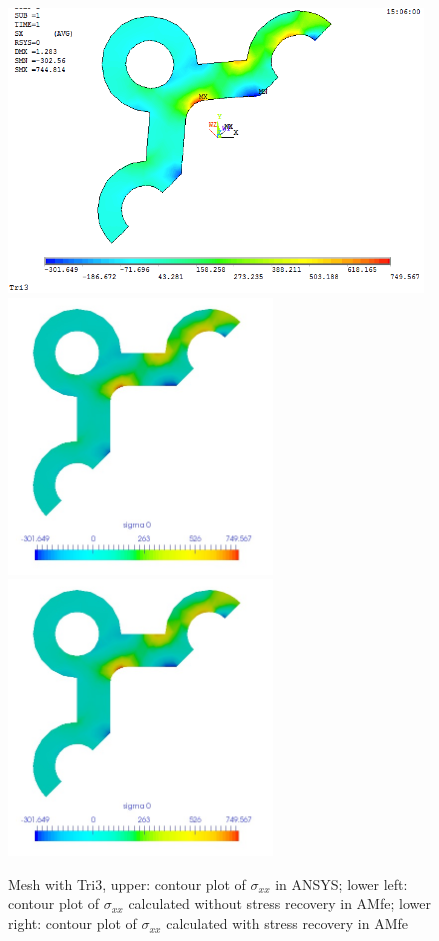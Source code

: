 \begin{figure}[htbp]
	\begin{center}
		\includegraphics[width=11cm,clip]{TTri3_Sxx.png} 	
		\includegraphics[width=7cm,clip]{TTri3_Sxx_PD.png} 		
		\includegraphics[width=7cm,clip]{TTri3_Sxx_P.png} 		
		\caption{Mesh with Tri3, upper: contour plot of $\sigma_{xx}$ in ANSYS; lower left: contour plot of $\sigma_{xx}$ calculated without stress recovery in AMfe; lower right: contour plot of $\sigma_{xx}$ calculated with stress recovery in AMfe} \label{fig: Tri3_Sxx}
	\end{center}
\end{figure}
\clearpage 

